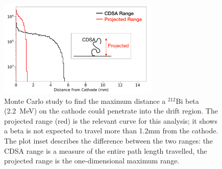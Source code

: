 \begin{figure}[ht]
    \centering
    \includegraphics[width=3in]{figures/radon/betaMC_inset.png}
    \caption{Monte Carlo study to find the maximum distance a $^{212}$Bi beta (2.2~MeV) on the cathode could penetrate into the drift region. The projected range (red) is the relevant curve for this analysis; it shows a beta is not expected to travel more than 1.2mm from the cathode. The plot inset describes the difference between the two ranges: the CDSA range is a measure of the entire path length travelled, the projected range is the one-dimensional maximum range.}
    \label{fig:betaMC}
\end{figure}



